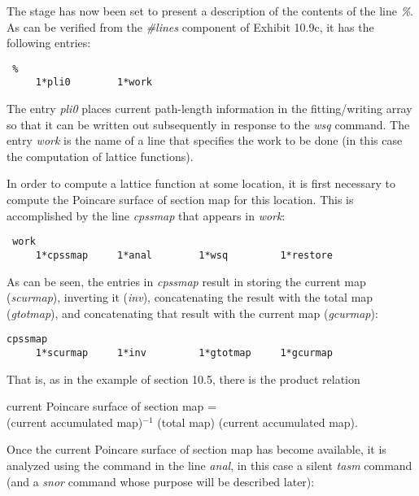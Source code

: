 The stage has now been set to present a description of the contents of the
line {\em \%}.  As can be verified from the {\em \#lines} component of
Exhibit 10.9c, it has the following entries:

\begin{footnotesize}
\begin{verbatim}
 %
     1*pli0        1*work
\end{verbatim}
\end{footnotesize}
The entry {\em pli0} places current path-length information in the
fitting/writing array so that it can be written out subsequently in
response to the {\em wsq} command.  The entry {\em work} is the name of a line that specifies the work to be
done (in this case the computation of lattice functions).

In order to compute a lattice function at some location, it is first
necessary to compute the Poincare surface of section map for this
location.  This is accomplished by the line {\em cpssmap} that appears in
{\em work}:

\begin{footnotesize}
\begin{verbatim}
 work
     1*cpssmap     1*anal        1*wsq         1*restore
\end{verbatim}
\end{footnotesize}
As can be seen, the entries in {\em cpssmap} result in storing the
current map ({\em scurmap}), inverting it ({\em inv}), concatenating the
result with the total map ({\em gtotmap}), and concatenating that result with
the current map ({\em gcurmap}):

\begin{footnotesize}
\begin{verbatim}
cpssmap
     1*scurmap     1*inv         1*gtotmap     1*gcurmap
\end{verbatim}
\end{footnotesize}
That is, as in the example of section 10.5, there is the product relation
\begin{center}
current Poincare surface of section map = \\
(current accumulated  map)$^{-1}$ (total map) (current accumulated map).
\end{center}

Once the current Poincare surface of section map has become available, it
is analyzed using the command in the line {\em anal}, in this case a
silent {\em tasm} command (and a {\em snor} command whose purpose will be
described later):


